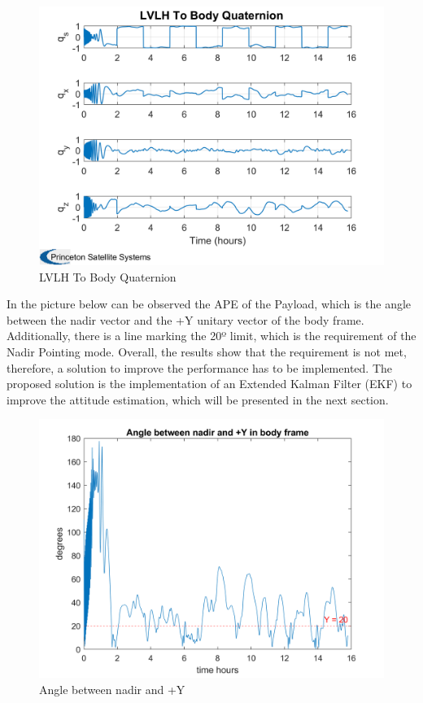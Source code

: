 \begin{itemize}
    \begin{figure}[H]
        \centering
        \includegraphics[width=0.7\linewidth]{res/img/Nadir_no_EKF/LVLH To Body Quaternion.png}
        \caption{LVLH To Body Quaternion}
        \label{fig:LVLHToBodyQuaternion}
    \end{figure}

\end{itemize}

\noindent In the picture below can be observed the APE of the Payload, which is the angle between the nadir vector and the +Y unitary vector of the body frame.
Additionally, there is a line marking the 20º limit, which is the requirement of the Nadir Pointing mode. 
Overall, the results show that the requirement is not met, therefore, a solution to improve the performance has to be implemented.
The proposed solution is the implementation of an Extended Kalman Filter (EKF) to improve the attitude estimation, which will be presented in the next section.

\begin{figure}[H]
    \centering
    \includegraphics[width=0.7\linewidth]{res/img/Nadir_no_EKF/Angle between nadir and +Y.png}
    \caption{Angle between nadir and +Y}
    \label{fig:AngleNadirY}
\end{figure}

